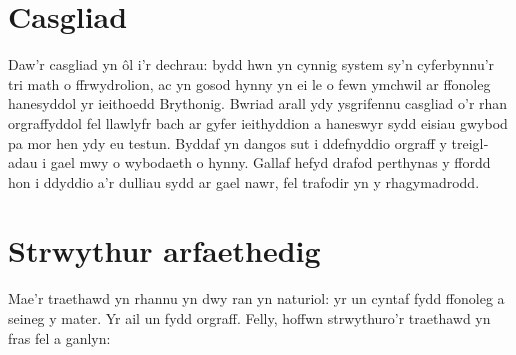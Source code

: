 \begin{welsh}
\section{Casgliad}
Daw'r casgliad yn \^ol i'r dechrau: bydd hwn yn cynnig system sy'n cyferbynnu'r tri math o ffrwydrolion, ac yn gosod hynny yn ei le o fewn ymchwil ar ffonoleg hanesyddol yr ieithoedd Brythonig. Bwriad arall ydy ysgrifennu casgliad o'r rhan orgraffyddol fel llawlyfr bach ar gyfer ieithyddion a haneswyr sydd eisiau gwybod pa mor hen ydy eu testun. Byddaf yn dangos sut i ddefnyddio orgraff y treigladau i gael mwy o wybodaeth o hynny. Gallaf hefyd drafod perthynas y ffordd hon i ddyddio a'r dulliau sydd ar gael nawr, fel trafodir yn y rhagymadrodd.


\section{Strwythur arfaethedig}

Mae'r traethawd yn rhannu yn dwy ran yn naturiol: yr un cyntaf fydd ffonoleg a seineg y mater. Yr ail un fydd orgraff. Felly, hoffwn strwythuro'r traethawd yn fras fel a ganlyn:


\end{welsh}
